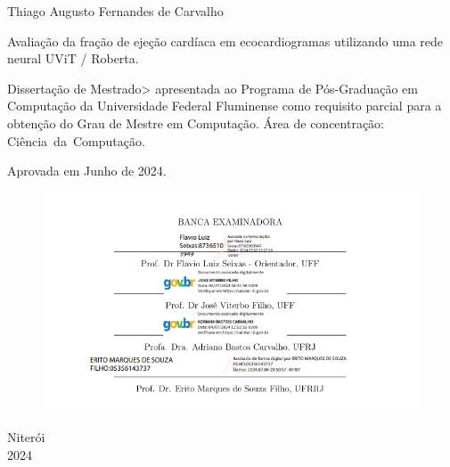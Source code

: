 \cleardoublepage


\pagestyle{ruledheader}
\setcounter{page}{1}

\cleardoublepage
\thispagestyle{empty}

\vspace{-60mm}

\begin{center}
   {\large Thiago Augusto Fernandes de Carvalho}\\
   \vspace{7mm}

  Avaliação da fração de ejeção cardíaca em ecocardiogramas utilizando
uma rede neural UViT / Roberta.\\
  \vspace{10mm}
\end{center}

\noindent
\begin{flushright}
\begin{minipage}[t]{8cm}

Dissertação de Mestrado> apresentada ao Programa de P\'{o}s-Gradua\c{c}\~{a}o em Computa\c{c}\~{a}o da Universidade Federal Fluminense como requisito parcial para a obten\c{c}\~{a}o do \mbox{Grau} de  Mestre em Computa\c{c}\~{a}o. \'{A}rea de concentra\c{c}\~{a}o: \mbox{Ciência da Computação.} %

\end{minipage}
\end{flushright}
\vspace{1.0 cm}
\noindent
Aprovada em  Junho de 2024. \\

\begin{figure}[!ht]
    \centering
    \includegraphics[width=1\linewidth]{capitulos//figuras/assinaturas.png}
    
    \label{fig:enter-label}
\end{figure}
\begin{center}
  \vspace{4mm}
  Niter\'{o}i \\
  2024

\end{center}



